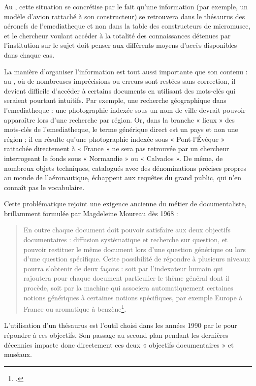 Au \mae, cette situation se concrétise par le fait qu’une information (par exemple, un modèle d’avion rattaché à son constructeur) se retrouvera dans le thésaurus des aéronefs de l’\gls{emediatheque} et non dans la table des constructeurs de \gls{micromusee}, et le chercheur voulant accéder à la totalité des connaissances détenues par l’institution sur le sujet doit penser aux différents moyens d’accès disponibles dans chaque cas.

La manière d’organiser l’information est tout aussi importante que son contenu : au \mae, où de nombreuses imprécisions ou erreurs sont restées sans correction, il devient difficile d’accéder à certains documents en utilisant des mots-clés qui seraient pourtant intuitifs. Par exemple, une recherche géographique dans l’\gls{emediatheque} : une photographie indexée sous un nom de ville devrait pouvoir apparaître lors d’une recherche par région. Or, dans la branche « lieux » des mots-clés de l’\gls{emediatheque}, le terme générique direct est un pays et non une région ; il en résulte qu’une photographie indexée sous « Pont-l’Évêque » rattachée directement à « France » ne sera pas retrouvée par un chercheur interrogeant le fonds sous « Normandie » ou « Calvados ». De même, de nombreux objets techniques, catalogués avec des dénominations précises propres au monde de l’aéronautique, échappent aux requêtes du grand public, qui n’en connaît pas le vocabulaire.

Cette problématique rejoint une exigence ancienne du métier de documentaliste, brillamment formulée par Magdeleine Moureau dès 1968 :

\begin{quote}
	\og En outre chaque document doit pouvoir satisfaire aux deux objectifs documentaires : diffusion systématique et recherche sur question, et pouvoir restituer le même document lors d’une question générique ou lors d’une question spécifique. Cette possibilité de répondre à plusieurs niveaux pourra s’obtenir de deux façons : soit par l’indexateur humain qui rajoutera pour chaque document particulier le thème général dont il procède, soit par la machine qui associera automatiquement certaines notions génériques à certaines notions spécifiques, par exemple Europe à France ou aromatique à benzène\footcite{moureauProblemesPosesPar1968}.\fg
\end{quote}

L’utilisation d’un thésaurus est l’outil choisi dans les années 1990 par le \mae pour répondre à ces objectifs. Son passage au second plan pendant les dernières décennies impacte donc directement ces deux « objectifs documentaires » et muséaux.

